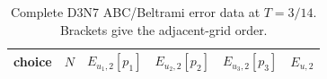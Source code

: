 \begin{table}[htbp]

\centering
\caption{Complete D3N7 ABC/Beltrami error data at $T=3/14$.  Brackets give the adjacent-grid order.}
\label{tab:numerical-beltrami-errors-full}
\begingroup
\scriptsize
\setlength{\tabcolsep}{2.8pt}
\begin{tabular}{@{}lrrrrr@{}}
\toprule
choice & $N$ & $E_{u_1,2}[p_1]$ & $E_{u_2,2}[p_2]$ & $E_{u_3,2}[p_3]$ & $E_{u,2}$\\
\midrule
\bottomrule
\end{tabular}
\endgroup
\end{table}
